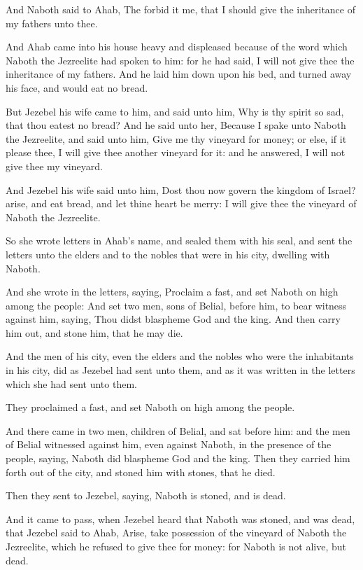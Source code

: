 \verse And Naboth said to Ahab, The \LORD forbid it me, that I should give the inheritance of my fathers unto thee.

\verse And Ahab came into his house heavy and displeased because of the word which Naboth the Jezreelite had spoken to him: for he had said, I will not give thee the inheritance of my fathers. And he laid him down upon his bed, and turned away his face, and would eat no bread.

\verse But Jezebel his wife came to him, and said unto him, Why is thy spirit so sad, that thou eatest no bread?  \verse And he said unto her, Because I spake unto Naboth the Jezreelite, and said unto him, Give me thy vineyard for money; or else, if it please thee, I will give thee another vineyard for it: and he answered, I will not give thee my vineyard.

\verse And Jezebel his wife said unto him, Dost thou now govern the kingdom of Israel? arise, and eat bread, and let thine heart be merry: I will give thee the vineyard of Naboth the Jezreelite.

\verse So she wrote letters in Ahab's name, and sealed them with his seal, and sent the letters unto the elders and to the nobles that were in his city, dwelling with Naboth.

\verse And she wrote in the letters, saying, Proclaim a fast, and set Naboth on high among the people: \verse And set two men, sons of Belial, before him, to bear witness against him, saying, Thou didst blaspheme God and the king. And then carry him out, and stone him, that he may die.

\verse And the men of his city, even the elders and the nobles who were the inhabitants in his city, did as Jezebel had sent unto them, and as it was written in the letters which she had sent unto them.

\verse They proclaimed a fast, and set Naboth on high among the people.

\verse And there came in two men, children of Belial, and sat before him: and the men of Belial witnessed against him, even against Naboth, in the presence of the people, saying, Naboth did blaspheme God and the king. Then they carried him forth out of the city, and stoned him with stones, that he died.

\verse Then they sent to Jezebel, saying, Naboth is stoned, and is dead.

\verse And it came to pass, when Jezebel heard that Naboth was stoned, and was dead, that Jezebel said to Ahab, Arise, take possession of the vineyard of Naboth the Jezreelite, which he refused to give thee for money: for Naboth is not alive, but dead.

